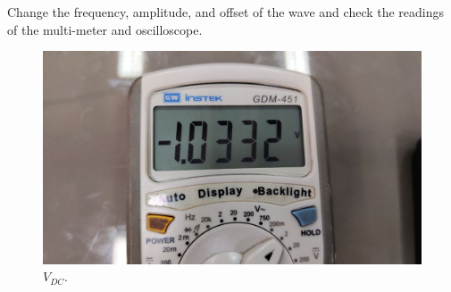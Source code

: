 \documentclass[11pt]{article}
\newcommand{\PicScale}{0.2}
\begin{document}
\begin{question}
\begin{subquestion}{Change the frequency, amplitude, and offset of the wave and check the readings of the multi-meter and oscilloscope.}
{            \begin{figure}[H]
                \begin{center}
                    \includegraphics[scale=\PicScale]{Fig/29.jpeg}
                    \caption{$V_{DC}$.}
                \end{center}
            \end{figure}
        }
    \end{subquestion}


\end{question}
\end{document}
